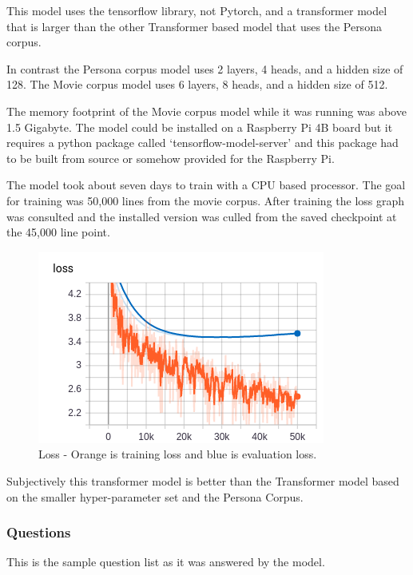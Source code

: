 This model uses the tensorflow library, not Pytorch, and a transformer model that is larger than the other Transformer based model that uses the Persona corpus.

In contrast the Persona corpus model uses 2 layers, 4 heads, and a hidden size of 128. The Movie corpus model uses 6 layers, 8 heads, and a hidden size of 512.

The memory footprint of the Movie corpus model while it was running was above 1.5 Gigabyte. The model could be installed on a Raspberry Pi 4B board but it requires a python package called `tensorflow-model-server' and this package had to be built from source or somehow provided for the Raspberry Pi. 

The model took about seven days to train with a CPU based processor. The goal for training was 50,000 lines from the movie corpus. After training the loss graph was consulted and the installed version was culled from the saved checkpoint at the 45,000 line point.


\begin{figure}[H]
	\begin{center}
		\includegraphics[scale=3.5]{Figure_2}
		
		
	\end{center}
	\caption[Loss - Larger Transformer Model]{Loss - Orange is training loss and blue is evaluation loss.}
	
\end{figure}

Subjectively this transformer model is better than the Transformer model based on the smaller hyper-parameter set and the Persona Corpus.


\subsubsection*{Questions}
This is the sample question list as it was answered by the model.

